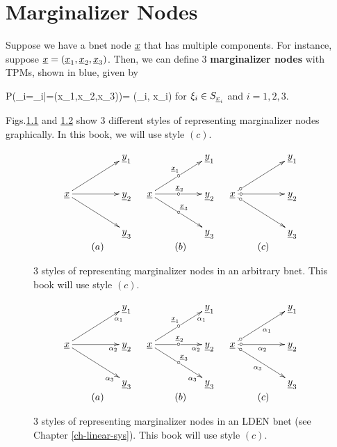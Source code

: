 \chapter{Marginalizer Nodes}
\label{marginalizer/marginalizer}

Suppose we have a bnet node ${\underline{x}}$
that has multiple components.
For instance, suppose
${\underline{x}}=({\underline{x}}_1, {\underline{x}}_2, {\underline{x}}_3)$.
Then, we can define 
3 {\bf marginalizer nodes}
with TPMs, shown in blue, given by

\beq\color{blue}
P(\rvx_i=\xi_i|\rvx=(x_1,x_2,x_3))= \delta(\xi_i, x_i)
\eeq
for $\xi_i\in S_{{\underline{x}}_i}$
and $i=1,2,3$.

Figs.\ref{fig-marginalizer}
and \ref{fig-marginalizer-lden}
show 3 different
styles of representing
marginalizer nodes graphically.
In this book,
we will use style $(c)$.

\begin{figure}[h!]
$$
\begin{array}{ccc}
\xymatrix@C=4pc{
&\rvy_1
\\
\rvx\ar[ru]
\ar[r]
\ar[rd]
&\rvy_2
\\
&\rvy_3
}
&
\xymatrix@C=4pc{
&\rvy_1
\\
\rvx\ar[ru]|-\circ^{\rvx_1}
\ar[r]|-\circ^{\rvx_2}
\ar[rd]|-\circ^{\rvx_3}
&\rvy_2
\\
&\rvy_3
}
&
\xymatrix@C=4pc{
&\rvy_1
\\
\rvx\ar[ru]|-<\circ
\ar[r]|-<\circ
\ar[rd]|-<\circ
&\rvy_2
\\
&\rvy_3
}
\\
(a)&(b)&(c)
\end{array}
$$
\caption{3 styles
of representing marginalizer nodes
in an arbitrary bnet.
This book
will use style $(c)$.}
\label{fig-marginalizer}
\end{figure}


\begin{figure}[h!]
$$
\begin{array}{ccc}
\xymatrix@C=4pc{
&\rvy_1
\\
\rvx\ar[ru]_>>>{\alpha_1}
\ar[r]_>>>{\alpha_2}
\ar[rd]_>>>{\alpha_3}
&\rvy_2
\\
&\rvy_3
}
&
\xymatrix@C=4pc{
&\rvy_1
\\
\rvx\ar[ru]_>>>{\alpha_1}|-\circ^{\rvx_1}
\ar[r]_>>>{\alpha_2}|-\circ^{\rvx_2}
\ar[rd]_>>>{\alpha_3}|-\circ^{\rvx_3}
&\rvy_2
\\
&\rvy_3
}
&
\xymatrix@C=4pc{
&\rvy_1
\\
\rvx\ar[ru]_{\alpha_1}|-<\circ
\ar[r]_{\alpha_2}|-<\circ
\ar[rd]_{\alpha_3}|-<\circ
&\rvy_2
\\
&\rvy_3
}
\\
(a)&(b)&(c)
\end{array}
$$
\caption{3 styles
of representing marginalizer nodes
in an LDEN bnet (see Chapter \ref{ch-linear-sys}).
This book
will use style $(c)$.}
\label{fig-marginalizer-lden}
\end{figure}

